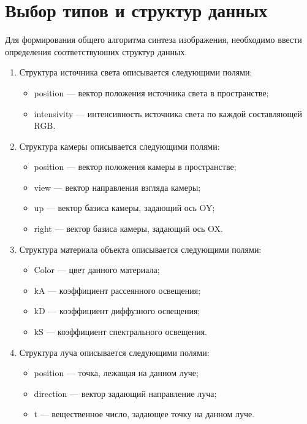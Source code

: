 \section{Выбор типов и структур данных}
Для формирования общего алгоритма синтеза изображения, необходимо ввести определения соответствуюших структур
данных.
\begin{enumerate}
	\item Структура источника света описывается следующими полями:
	\begin{itemize}
		\item position --- вектор положения источника света в пространстве;
		\item intensivity --- интенсивность источника света по каждой составляющей RGB.
	\end{itemize}
	
	\item Структура камеры описывается следующими полями:
	\begin{itemize}
		\item position --- вектор положения камеры в пространстве;
		\item view --- вектор направления взгляда камеры;
		\item up --- вектор базиса камеры, задающий ось OY;
		\item right --- вектор базиса камеры, задающий ось OX.
	\end{itemize}
	
	\item Структура материала объекта описывается следующими полями:
	\begin{itemize}
		\item Color --- цвет данного материала;
		\item kA --- коэффициент рассеянного освещения;
		\item kD --- коэффициент диффузного освещения;
		\item kS --- коэффициент спектрального освещения.
	\end{itemize}
	
	
	\item Структура луча описывается следующими полями:
	\begin{itemize}
		\item position --- точка, лежащая на данном луче;
		\item direction --- вектор задающий направление луча;
		\item t --- вещественное число, задающее точку на данном луче.
	\end{itemize}
	

\end{enumerate}
